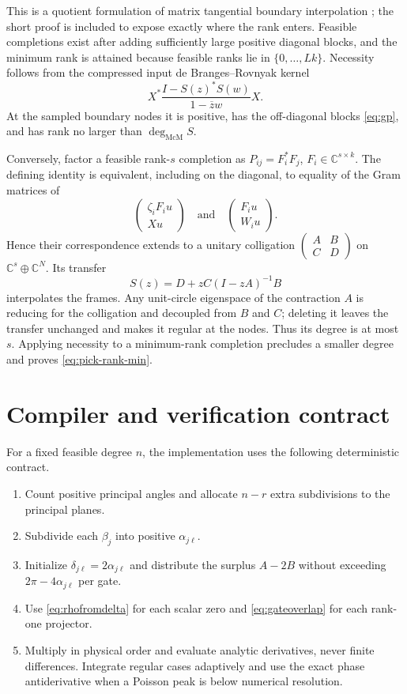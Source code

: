 \documentclass[11pt]{article}
\theoremstyle{definition}
\theoremstyle{remark}
\newcommand{\C}{\mathbb C}
\newcommand{\mcdeg}{\deg_{\mathrm{McM}}}
\begin{document}
This is a quotient formulation of matrix tangential boundary interpolation
\cite{BolotnikovDym2006}; the short proof is included to expose exactly where
the rank enters.  Feasible completions exist after adding sufficiently large
positive diagonal blocks, and the minimum rank is attained because feasible
ranks lie in $\{0,\ldots,Lk\}$.  Necessity follows from the compressed input
de Branges--Rovnyak kernel
\[
 X^*\frac{I-S(z)^*S(w)}{1-\overline zw}X.
\]
At the sampled boundary nodes it is positive, has the off-diagonal blocks
\eqref{eq:gp}, and has rank no larger than $\mcdeg S$.

Conversely, factor a feasible rank-$s$ completion as
$P_{ij}=F_i^*F_j$, $F_i\in\C^{s\times k}$.  The defining identity is
equivalent, including on the diagonal, to equality of the Gram matrices of
\begin{equation}\label{eq:lurking}
 \begin{pmatrix}\zeta_iF_i u\\Xu\end{pmatrix}
 \quad\text{and}\quad
 \begin{pmatrix}F_i u\\W_i u\end{pmatrix}.
\end{equation}
Hence their correspondence extends to a unitary colligation
$\left(\begin{smallmatrix}A&B\\C&D\end{smallmatrix}\right)$ on
$\C^s\oplus\C^N$.  Its transfer
\[
 S(z)=D+zC(I-zA)^{-1}B
\]
interpolates the frames.  Any unit-circle eigenspace of the contraction $A$
is reducing for the colligation and decoupled from $B$ and $C$; deleting it
leaves the transfer unchanged and makes it regular at the nodes.  Thus its
degree is at most $s$.  Applying necessity to a minimum-rank completion
precludes a smaller degree and proves \eqref{eq:pick-rank-min}.

\section{Compiler and verification contract}

For a fixed feasible degree $n$, the implementation uses the following
deterministic contract.
\begin{enumerate}
 \item Count positive principal angles and allocate $n-r$ extra subdivisions
 to the principal planes.
 \item Subdivide each $\beta_j$ into positive $\alpha_{j\ell}$.
 \item Initialize $\delta_{j\ell}=2\alpha_{j\ell}$ and distribute the surplus
 $A-2B$ without exceeding $2\pi-4\alpha_{j\ell}$ per gate.
 \item Use \eqref{eq:rhofromdelta} for each scalar zero and
 \eqref{eq:gateoverlap} for each rank-one projector.
 \item Multiply in physical order and evaluate analytic derivatives, never
 finite differences.  Integrate regular cases adaptively and use the exact
 phase antiderivative when a Poisson peak is below numerical resolution.
\end{enumerate}
\end{document}
